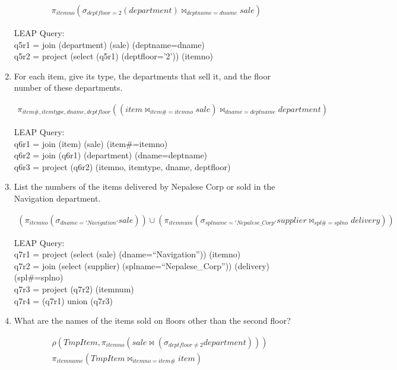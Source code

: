 \documentclass[10pt]{article}
\begin{document}
\begin{enumerate}
  \begin{align*}
    \pi_{itemno}(\sigma_{deptfloor=2}(department)
    \bowtie_{deptname=dname} sale)
  \end{align*}

  LEAP Query:\\
  q5r1 = join (department) (sale) (deptname=dname)\\
  q5r2 = project (select (q5r1) (deptfloor='2')) (itemno)

\item For each item, give its type, the departments that sell it, and
  the floor number of these departments.

  \begin{align*}
    \pi_{item\#, itemtype, dname, deptfloor}((item
    \bowtie_{item\#=itemno} sale) \bowtie_{dname=deptname} department)
  \end{align*}

  LEAP Query:\\
  q6r1 = join (item) (sale) (item\#=itemno)\\
  q6r2 = join (q6r1) (department) (dname=deptname)\\
  q6r3 = project (q6r2) (itemno, itemtype, dname, deptfloor)

\item List the numbers of the items delivered by Nepalese Corp or sold
  in the Navigation department.

  \begin{align*}
    (\pi_{itemno}(\sigma_{dname='Navigation'}sale)) \cup
    (\pi_{itemnum}(\sigma_{splname='Nepalese\_Corp'}supplier
    \bowtie_{spl\#=splno} delivery))
  \end{align*}

  LEAP Query:\\
  q7r1 = project (select (sale) (dname=``Navigation'')) (itemno)\\
  q7r2 = join (select (supplier) (splname=``Nepalese\_Corp''))
  (delivery) (spl\#=splno)\\
  q7r3 = project (q7r2) (itemnum)\\
  q7r4 = (q7r1) union (q7r3)

\item What are the names of the items sold on floors other than the
  second floor?

  \begin{align*}
    &\rho(TmpItem, \pi_{itemno}(sale \bowtie (\sigma_{deptfloor \neq
      2}department)))\\
    &\pi_{itemname}(TmpItem \bowtie_{itemno=item\#} item)
  \end{align*}


\end{enumerate}
\end{document}
